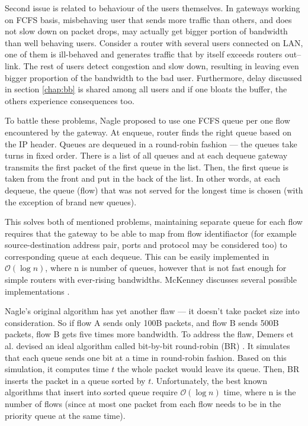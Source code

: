 Second issue is related to behaviour of the users themselves. In gateways working on FCFS basis, misbehaving user that sends more traffic than others, and does not slow down on packet drops, may actually get bigger portion of bandwidth than well behaving users. Consider a router with several users connected on LAN, one of them is ill-behaved and generates traffic that by itself exceeds routers out--link. The rest of users detect congestion and slow down, resulting in leaving even bigger proportion of the bandwidth to the bad user. Furthermore, delay discussed in section \ref{chap:bb} is shared among all users and if one bloats the buffer, the others experience consequences too.

To battle these problems, Nagle \cite{Nagle:FQ} proposed to use one FCFS queue per one flow encountered by the gateway. At enqueue, router finds the right queue based on the IP header. Queues are dequeued in a round-robin fashion --- the queues take turns in fixed order. There is a list of all queues and at each dequeue gateway transmits the first packet of the first queue in the list. Then, the first queue is taken from the front and put in the back of the list. In other words, at each dequeue, the queue (flow) that was not served for the longest time is chosen (with the exception of brand new queues).

This solves both of mentioned problems, maintaining separate queue for each flow requires that the gateway to be able to map from flow identifiactor (for example source-destination address pair, ports and protocol may be considered too) to corresponding queue at each dequeue. This can be easily implemented in $\mathcal{O}(\log n)$, where n is number of queues, however that is not fast enough for simple routers with ever-rising bandwidths. McKenney discusses several possible implementations \cite[Section 2]{SFQ}.

Nagle's original algorithm has yet another flaw --- it doesn't take packet size into consideration. So if flow A sends only 100B packets, and flow B sends 500B packets, flow B gets five times more bandwidth. To address the flaw,  Demers et al. devised an ideal algorithm called bit-by-bit round-robin (BR) \cite{demers1989analysis}. It simulates that each queue sends one bit at a time in round-robin fashion. Based on this simulation, it computes time $t$ the whole packet would leave its queue. Then, BR inserts the packet in a queue sorted by $t$. Unfortunately, the best known algorithms that insert into sorted queue require $\mathcal{O}(\log n)$ time, where n is the number of flows (since at most one packet from each flow needs to be in the priority queue at the same time).

